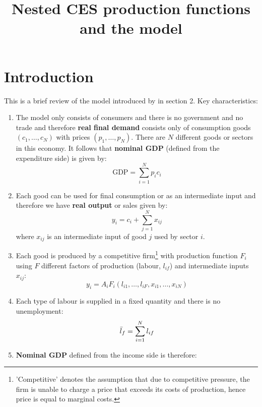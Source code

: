 \documentclass{article}
\title{Nested CES production functions and the \parencite{BF2019} model}
\begin{document}
\maketitle


\section{Introduction}
This is a brief review of the model introduced by \parencite{BF2019} in section 2. Key characteristics: 
\begin{enumerate}
    \item The model only consists of consumers and there is no government and no trade and therefore \textbf{real final demand} consists only of consumption goods $(c_1, \dots, c_N)$ with prices $(p_1, \dots, p_N)$. There are $N$ different goods or sectors in this economy. It follows that \textbf{nominal GDP} (defined from the expenditure side) is given by:
        \begin{equation}\label{GDP_exp}
            \text{GDP} = \sum_{i=1}^{N} p_i c_i
        \end{equation}
    \item Each good can be used for final consumption or as an intermediate input and therefore we have \textbf{real output} or sales given by:
        \begin{equation}\label{eq:goods_clear}
            y_i = c_i + \sum_{j=1}^N x_{ij}
        \end{equation}
    where $x_{ij}$ is an intermediate input of good $j$ used by sector $i$.
    \item Each good is produced by a competitive firm\footnote{'Competitive' denotes the assumption that due to competitive pressure, the firm is unable to charge a price that exceeds its costs of production, hence price is equal to marginal costs.} with production function $F_i$ using $F$ different factors of production (labour, $l_{if}$) and intermediate inputs $x_{ij}$:
        \begin{equation}\label{gen_prodfunc}
            y_i = A_i F_i\left( l_{i1}, \dots, l_{iF}, x_{i1}, \dots, x_{iN}  \right)
        \end{equation}
    \item Each type of labour is supplied in a fixed quantity and there is no unemployment:
        \begin{equation}\label{labour_clear}
            \Bar{l}_f = \sum_{i=1}^N l_{if}
        \end{equation}
    \item \textbf{Nominal GDP} defined from the income side is therefore:

\end{enumerate}
\end{document}

